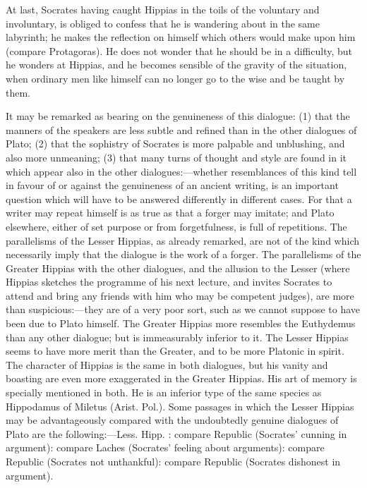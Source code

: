 \documentclass[11pt,letter]{article}
\begin{document}
\par  At last, Socrates having caught Hippias in the toils of the voluntary and involuntary, is obliged to confess that he is wandering about in the same labyrinth; he makes the reflection on himself which others would make upon him (compare Protagoras). He does not wonder that he should be in a difficulty, but he wonders at Hippias, and he becomes sensible of the gravity of the situation, when ordinary men like himself can no longer go to the wise and be taught by them.

\par  It may be remarked as bearing on the genuineness of this dialogue: (1) that the manners of the speakers are less subtle and refined than in the other dialogues of Plato; (2) that the sophistry of Socrates is more palpable and unblushing, and also more unmeaning; (3) that many turns of thought and style are found in it which appear also in the other dialogues:—whether resemblances of this kind tell in favour of or against the genuineness of an ancient writing, is an important question which will have to be answered differently in different cases. For that a writer may repeat himself is as true as that a forger may imitate; and Plato elsewhere, either of set purpose or from forgetfulness, is full of repetitions. The parallelisms of the Lesser Hippias, as already remarked, are not of the kind which necessarily imply that the dialogue is the work of a forger. The parallelisms of the Greater Hippias with the other dialogues, and the allusion to the Lesser (where Hippias sketches the programme of his next lecture, and invites Socrates to attend and bring any friends with him who may be competent judges), are more than suspicious:—they are of a very poor sort, such as we cannot suppose to have been due to Plato himself. The Greater Hippias more resembles the Euthydemus than any other dialogue; but is immeasurably inferior to it. The Lesser Hippias seems to have more merit than the Greater, and to be more Platonic in spirit. The character of Hippias is the same in both dialogues, but his vanity and boasting are even more exaggerated in the Greater Hippias. His art of memory is specially mentioned in both. He is an inferior type of the same species as Hippodamus of Miletus (Arist. Pol.). Some passages in which the Lesser Hippias may be advantageously compared with the undoubtedly genuine dialogues of Plato are the following:—Less. Hipp. : compare Republic (Socrates' cunning in argument): compare Laches (Socrates' feeling about arguments): compare Republic (Socrates not unthankful): compare Republic (Socrates dishonest in argument).
\end{document}
